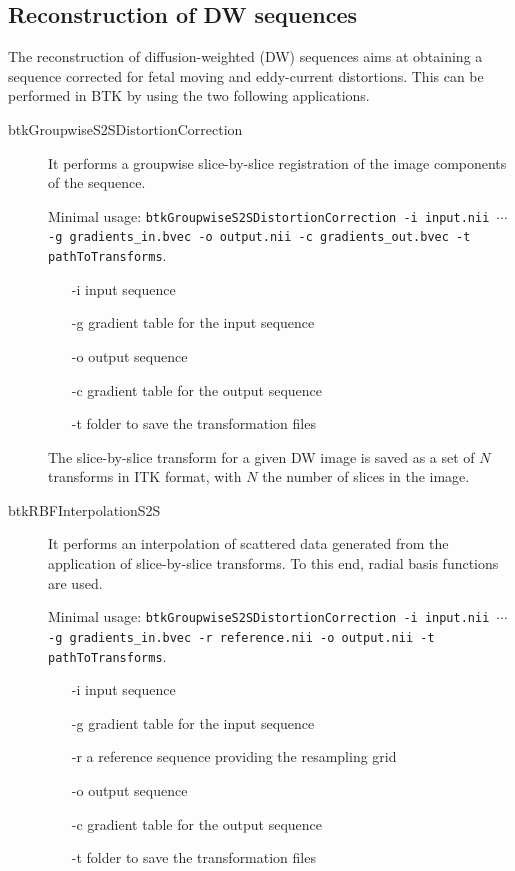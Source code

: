 \subsection{Reconstruction of DW sequences}
The reconstruction of diffusion-weighted (DW) sequences aims at
obtaining a sequence corrected for fetal moving and eddy-current distortions.
This can be performed in BTK by using the two following applications. 
\begin{description}
\item[btkGroupwiseS2SDistortionCorrection] It performs a groupwise
slice-by-slice registration of the image components of the sequence.

Minimal usage: \texttt{btkGroupwiseS2SDistortionCorrection -i input.nii
$\cdots$ -g gradients\_in.bvec -o output.nii -c gradients\_out.bvec -t
pathToTransforms}.

\begin{itemize}
 \item[-i] input sequence
 \item[-g] gradient table for the input sequence
 \item[-o] output sequence 
 \item[-c] gradient table for the output sequence
 \item[-t] folder to save the transformation files
\end{itemize}

The slice-by-slice transform for a given DW image is saved as a set of $N$
transforms in ITK format, with $N$ the number of slices in the image.

\item[btkRBFInterpolationS2S] It performs an interpolation of scattered data
generated from the application of slice-by-slice transforms. To this end,
radial basis functions are used.

Minimal usage: \texttt{btkGroupwiseS2SDistortionCorrection -i input.nii
$\cdots$ -g gradients\_in.bvec -r reference.nii -o output.nii -t
pathToTransforms}.

\begin{itemize}
 \item[-i] input sequence
 \item[-g] gradient table for the input sequence
 \item[-r] a reference sequence providing the resampling grid
 \item[-o] output sequence 
 \item[-c] gradient table for the output sequence
 \item[-t] folder to save the transformation files \\
\end{itemize}

\end{description}


